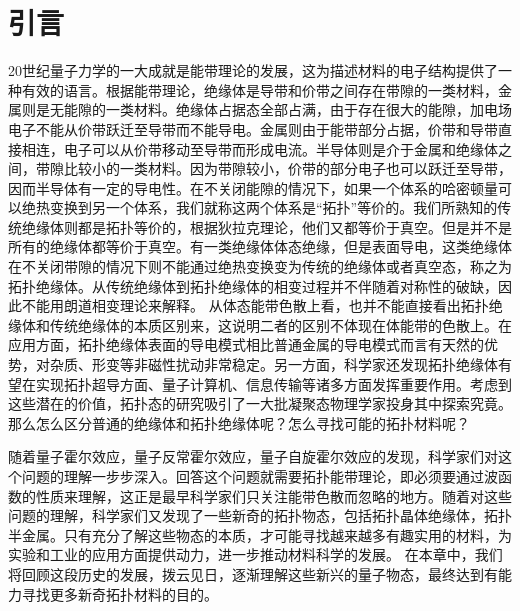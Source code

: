 \chapter{引言}\label{chap:introduction}
20世纪量子力学的一大成就是能带理论的发展，这为描述材料的电子结构提供了一种有效的语言。根据能带理论，绝缘体是导带和价带之间存在带隙的一类材料，金属则是无能隙的一类材料。绝缘体占据态全部占满，由于存在很大的能隙，加电场电子不能从价带跃迁至导带而不能导电。金属则由于能带部分占据，价带和导带直接相连，电子可以从价带移动至导带而形成电流。半导体则是介于金属和绝缘体之间，带隙比较小的一类材料。因为带隙较小，价带的部分电子也可以跃迁至导带，因而半导体有一定的导电性。在不关闭能隙的情况下，如果一个体系的哈密顿量可以绝热变换到另一个体系，我们就称这两个体系是“拓扑”等价的。我们所熟知的传统绝缘体则都是拓扑等价的，根据狄拉克理论，他们又都等价于真空。但是并不是所有的绝缘体都等价于真空。有一类绝缘体体态绝缘，但是表面导电，这类绝缘体在不关闭带隙的情况下则不能通过绝热变换变为传统的绝缘体或者真空态，称之为拓扑绝缘体。从传统绝缘体到拓扑绝缘体的相变过程并不伴随着对称性的破缺，因此不能用朗道相变理论来解释。
从体态能带色散上看，也并不能直接看出拓扑绝缘体和传统绝缘体的本质区别来，这说明二者的区别不体现在体能带的色散上。在应用方面，拓扑绝缘体表面的导电模式相比普通金属的导电模式而言有天然的优势，对杂质、形变等非磁性扰动非常稳定。另一方面，科学家还发现拓扑绝缘体有望在实现拓扑超导方面、量子计算机、信息传输等诸多方面发挥重要作用。考虑到这些潜在的价值，拓扑态的研究吸引了一大批凝聚态物理学家投身其中探索究竟。那么怎么区分普通的绝缘体和拓扑绝缘体呢？怎么寻找可能的拓扑材料呢？

随着量子霍尔效应，量子反常霍尔效应，量子自旋霍尔效应的发现，科学家们对这个问题的理解一步步深入。回答这个问题就需要拓扑能带理论，即必须要通过波函数的性质来理解，这正是最早科学家们只关注能带色散而忽略的地方。随着对这些问题的理解，科学家们又发现了一些新奇的拓扑物态，包括拓扑晶体绝缘体，拓扑半金属。只有充分了解这些物态的本质，才可能寻找越来越多有趣实用的材料，为实验和工业的应用方面提供动力，进一步推动材料科学的发展。
在本章中，我们将回顾这段历史的发展，拨云见日，逐渐理解这些新兴的量子物态，最终达到有能力寻找更多新奇拓扑材料的目的。


